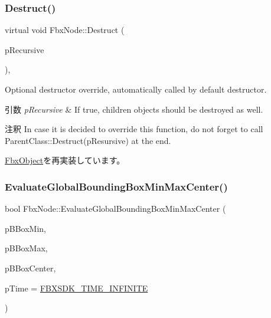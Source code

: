 \subsubsection{\texorpdfstring{Destruct()}{Destruct()}}
{\footnotesize\ttfamily virtual void Fbx\+Node\+::\+Destruct (\begin{DoxyParamCaption}\item[{bool}]{p\+Recursive }\end{DoxyParamCaption})\hspace{0.3cm}{\ttfamily [protected]}, {\ttfamily [virtual]}}

Optional destructor override, automatically called by default destructor. 
\begin{DoxyParams}{引数}
{\em p\+Recursive} & If true, children objects should be destroyed as well. \\
\hline
\end{DoxyParams}
\begin{DoxyRemark}{注釈}
In case it is decided to override this function, do not forget to call Parent\+Class\+::\+Destruct(p\+Resursive) at the end. 
\end{DoxyRemark}


\hyperlink{class_fbx_object_a123e084d9b32b29c28af6384b7c3c608}{Fbx\+Object}を再実装しています。

\mbox{\label{class_fbx_node_a0e847ea3d090ef90c79051fd013a5966}} 
\subsubsection{\texorpdfstring{Evaluate\+Global\+Bounding\+Box\+Min\+Max\+Center()}{EvaluateGlobalBoundingBoxMinMaxCenter()}}
{\footnotesize\ttfamily bool Fbx\+Node\+::\+Evaluate\+Global\+Bounding\+Box\+Min\+Max\+Center (\begin{DoxyParamCaption}\item[{\hyperlink{class_fbx_vector4}{Fbx\+Vector4} \&}]{p\+B\+Box\+Min,  }\item[{\hyperlink{class_fbx_vector4}{Fbx\+Vector4} \&}]{p\+B\+Box\+Max,  }\item[{\hyperlink{class_fbx_vector4}{Fbx\+Vector4} \&}]{p\+B\+Box\+Center,  }\item[{const \hyperlink{class_fbx_time}{Fbx\+Time} \&}]{p\+Time = {\ttfamily \hyperlink{fbxtime_8h_a1e6db3fe0f84f0b7daa775739f93526f}{F\+B\+X\+S\+D\+K\+\_\+\+T\+I\+M\+E\+\_\+\+I\+N\+F\+I\+N\+I\+TE}} }\end{DoxyParamCaption})}

